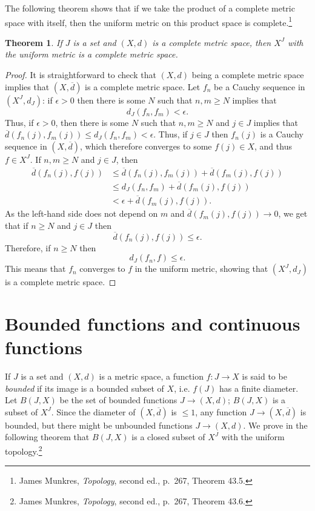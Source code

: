 \documentclass{article}
\newtheorem{theorem}{Theorem}
\theoremstyle{definition}
\begin{document}
The following theorem shows that if we take the product of a complete metric space with itself, then the uniform metric on this product
space is complete.\footnote{James Munkres, {\em Topology}, second ed., p.~267, Theorem 43.5.}

\begin{theorem}
If $J$ is a set and $(X,d)$ is a complete metric space, then $X^J$ with the uniform metric is a complete metric space.
\label{completefunctions}
\end{theorem}
\begin{proof}
It is straightforward to check that $(X,d)$ being a complete metric space implies that
$(X,\overline{d})$ is a complete metric space. Let $f_n$ be a Cauchy sequence in $(X^J,d_J)$: if $\epsilon>0$
then there is some $N$ such that $n,m \geq N$ implies that
\[
d_J(f_n,f_m)<\epsilon.
\]
Thus, if $\epsilon>0$, then there is some $N$ such that $n,m \geq N$ and $j \in J$ implies that
$\overline{d}(f_n(j),f_m(j)) \leq d_J(f_n,f_m)<\epsilon$.
Thus, if $j \in J$ then $f_n(j)$ is a Cauchy sequence in $(X,\overline{d})$, which therefore converges to some $f(j) \in X$,
and thus $f \in X^J$. 
If $n,m \geq N$ and $j \in J$, then
\begin{align*}
\overline{d}(f_n(j),f(j)) &\leq \overline{d}(f_n(j),f_m(j)) + \overline{d}(f_m(j),f(j))\\
&\leq d_J(f_n,f_m)+\overline{d}(f_m(j),f(j))\\
&<\epsilon+\overline{d}(f_m(j),f(j)).
\end{align*}
As the left-hand side does not depend on $m$ and $\overline{d}(f_m(j),f(j)) \to 0$, we get that if $n \geq N$ and $j \in J$
then
\[
\overline{d}(f_n(j),f(j)) \leq \epsilon.
\]
Therefore, if $n \geq N$ then 
\[
d_J(f_n,f) \leq \epsilon.
\]
This means that $f_n$ converges to $f$ in the uniform metric, showing that $(X^J,d_J)$ is a complete metric space.
\end{proof}


\section{Bounded functions and continuous functions}
If $J$ is a set and $(X,d)$ is a metric space,
a function $f:J \to X$ is said to be {\em bounded} if its image is a bounded subset of $X$, i.e. $f(J)$ has a finite diameter. 
Let $B(J,X)$ be the set of bounded functions $J \to (X,d)$; $B(J,X)$ is a subset of $X^J$.
Since the diameter
of $(X,\overline{d})$ is $\leq 1$, any function $J \to (X,\overline{d})$ is bounded, but there might be unbounded functions
$J \to (X,d)$.
We prove in the following theorem that $B(J,X)$ is a closed subset of $X^J$ with the uniform topology.\footnote{James Munkres,
{\em Topology}, second ed., p.~267, Theorem 43.6.} 
\end{document}
